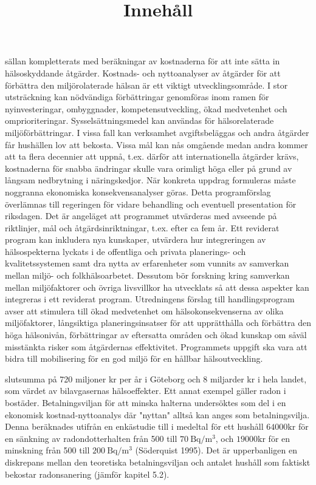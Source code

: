 sällan kompletterats med beräkningar av kostnaderna för att inte sätta in hälsoskyddande åtgärder. Kostnads- och nyttoanalyser av åtgärder för att förbättra den miljörolaterade hälsan är ett viktigt utvecklingsområde.
I stor utsträckning kan nödvändiga förbättringar genomföras inom ramen för nyinvesteringar, ombyggnader, kompetensutveckling, ökad medvetenhet och omprioriteringar. Sysselsättningsmedel kan användas för hälsorelaterade miljöförbättringar. I vissa fall kan verksamhet avgiftsbeläggas och andra åtgärder får hushällen lov att bekosta. Vissa mål kan nås omgående medan andra kommer att ta flera decennier att uppnå, t.ex. därför att internationella åtgärder krävs, kostnaderna för snabba ändringar skulle vara orimligt höga eller på grund av långsam nedbrytning i näringskedjor. När konkreta uppdrag formuleras måste noggranna ekonomiska konsekvensanalyser göras.
Detta programförslag överlämnas till regeringen för vidare behandling och eventuell presentation för riksdagen. Det är angeläget att programmet utvärderas med avseende på riktlinjer, mål och åtgärdsinriktningar, t.ex. efter ca fem år. Ett reviderat program kan inkludera nya kunskaper, utvärdera hur integreringen av hälsospekterna lyckats i de offentliga och privata planerings- och kvalitetssystemen samt dra nytta av erfarenheter som vunnits av samverkan mellan miljö- och folkhälsoarbetet. Dessutom bör forskning kring samverkan mellan miljöfaktorer och övriga livsvillkor ha utvecklats så att dessa aspekter kan integreras i ett reviderat program.
Utredningens förslag till handlingsprogram avser att stimulera till ökad medvetenhet om hälsokonsekvenserna av olika miljöfaktorer, långsiktiga planeringsinsatser för att upprätthålla och förbättra den höga hälsonivån, förbättringar av eftersatta områden och ökad kunskap om såväl misstänkta risker som åtgärdernas effektivitet. Programmets uppgift ska vara att bidra till mobilisering för en god miljö för en hållbar hälsoutveckling.

\title{
Innehåll
}

slutsumma på 720 miljoner kr per år i Göteborg och 8 miljarder kr i hela landet, som värdet av bilavgasernas hälsoeffekter.
Ett annat exempel gäller radon i bostäder. Betalningsviljan för att minska halterna undersöktes som del i en ekonomisk kostnad-nyttoanalys där "nyttan" alltså kan anges som betalningsvilja. Denna beräknades utifrån en enkästudie till i medeltal för ett hushåll \(64000 \mathrm{kr}\) för en sänkning av radondotterhalten från 500 till \(70 \mathrm{~Bq} / \mathrm{m}^{3}\), och \(19000 \mathrm{kr}\) för en minskning från 500 till \(200 \mathrm{~Bq} / \mathrm{m}^{3}\) (Söderquist 1995). Det är upperbanligen en diskrepans mellan den teoretiska betalningsviljan och antalet hushåll som faktiskt bekostar radonsanering (jämför kapitel 5.2).
